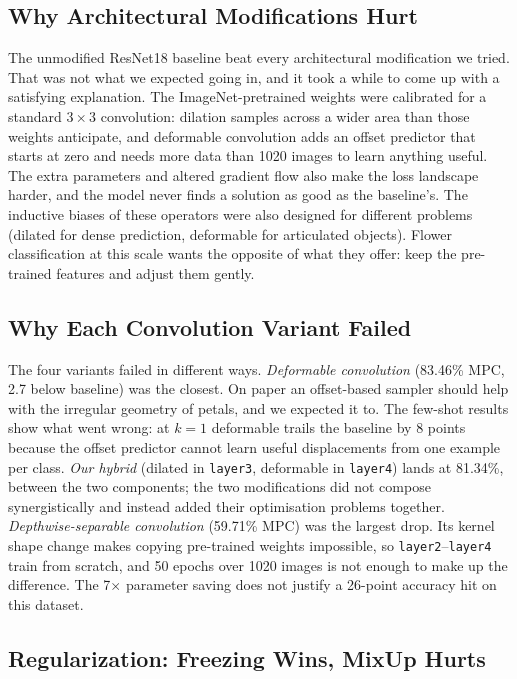\subsection{Why Architectural Modifications Hurt}

The unmodified ResNet18 baseline beat every architectural modification we tried. That was not what we expected going in, and it took a while to come up with a satisfying explanation. The ImageNet-pretrained weights were calibrated for a standard $3 \times 3$ convolution: dilation samples across a wider area than those weights anticipate, and deformable convolution adds an offset predictor that starts at zero and needs more data than 1020 images to learn anything useful. The extra parameters and altered gradient flow also make the loss landscape harder, and the model never finds a solution as good as the baseline's. The inductive biases of these operators were also designed for different problems (dilated for dense prediction, deformable for articulated objects). Flower classification at this scale wants the opposite of what they offer: keep the pre-trained features and adjust them gently.

\subsection{Why Each Convolution Variant Failed}

The four variants failed in different ways. \emph{Deformable convolution} (83.46\% MPC, 2.7 below baseline) was the closest. On paper an offset-based sampler should help with the irregular geometry of petals, and we expected it to. The few-shot results show what went wrong: at $k = 1$ deformable trails the baseline by 8 points because the offset predictor cannot learn useful displacements from one example per class. \emph{Our hybrid} (dilated in \texttt{layer3}, deformable in \texttt{layer4}) lands at 81.34\%, between the two components; the two modifications did not compose synergistically and instead added their optimisation problems together. \emph{Depthwise-separable convolution} (59.71\% MPC) was the largest drop. Its kernel shape change makes copying pre-trained weights impossible, so \texttt{layer2}--\texttt{layer4} train from scratch, and 50 epochs over 1020 images is not enough to make up the difference. The 7$\times$ parameter saving does not justify a 26-point accuracy hit on this dataset.

\subsection{Regularization: Freezing Wins, MixUp Hurts}

